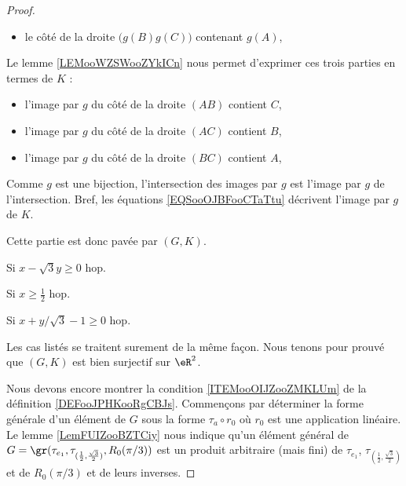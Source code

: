 \begin{proof}
\begin{subproof}
\begin{subproof}
\begin{subproof}
\begin{itemize}
					\item le côté de la droite \( \big( g(B)g(C)\big)\) contenant \( g(A)\),
				\end{itemize}
				Le lemme \ref{LEMooWZSWooZYkICn} nous permet d'exprimer ces trois parties en termes de \( K\) :
				\begin{itemize}
					\item l'image par \( g\) du côté de la droite \( (AB)\) contient \( C\),
					\item l'image par \( g\) du côté de la droite \( (AC)\) contient \( B\),
					\item l'image par \( g\) du côté de la droite \( (BC)\) contient \( A\),
				\end{itemize}
				Comme \( g\) est une bijection, l'intersection des images par \( g\) est l'image par \( g\) de l'intersection. Bref, les équations \eqref{EQSooOJBFooCTaTtu} décrivent l'image par \( g\) de \( K\).

				Cette partie est donc pavée par \( (G,K)\).
				\item[Si \( x-\sqrt{ 3 }y\geq 0\)]
				hop.
			\end{subproof}

			\item[Si \( x\geq \frac{ 1 }{2}\)]
			hop.
		\end{subproof}
		\item[Si \( x+y/\sqrt{ 3 }-1\geq 0\)]
		hop.
	\end{subproof}
	Les cas listés se traitent surement de la même façon. Nous tenons pour prouvé que \( (G,K)\) est bien surjectif sur \( \eR^2\).

	Nous devons encore montrer la condition \ref{ITEMooOIJZooZMKLUm} de la définition \ref{DEFooJPHKooRgCBJs}. Commençons par déterminer la forme générale d'un élément de \( G\) sous la forme \( \tau_a\circ r_0\) où \( r_0\) est une application linéaire. Le lemme \ref{LemFUIZooBZTCiy} nous indique qu'un élément général de \( G=\gr(\tau_{e_1}, \tau_{(\frac{ 1 }{2},\frac{ \sqrt{ 3 } }{2})}, R_0(\pi/3))\) est un produit arbitraire (mais fini) de \( \tau_{e_1}\), \( \tau_{(\frac{ 1 }{2},\frac{ \sqrt{ 3 } }{2})}\) et de \( R_0(\pi/3)\) et de leurs inverses.


\end{proof}
